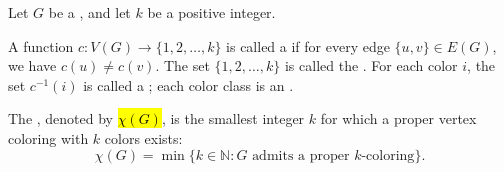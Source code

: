 \begin{definition} \label{definition:proper_vertex_coloring_chromatic_number_of_a_graph}
Let $G$ be a , and let $k$ be a positive integer.

A function $c: V(G) \to \{1, 2, \dots, k\}$ is called a  if for every edge $\{u,v\} \in E(G)$, we have $c(u) \neq c(v)$. The set $\{1, 2, \dots, k\}$ is called the . For each color $i$, the set $c^{-1}(i)$ is called a ; each color class is an .

The , denoted by \hl{$\chi(G)$}, is the smallest integer $k$ for which a proper vertex coloring with $k$ colors exists:
$$\chi(G) = \min\{k \in \mathbb{N} : G \text{ admits a proper } k\text{-coloring}\}.$$
\end{definition}
